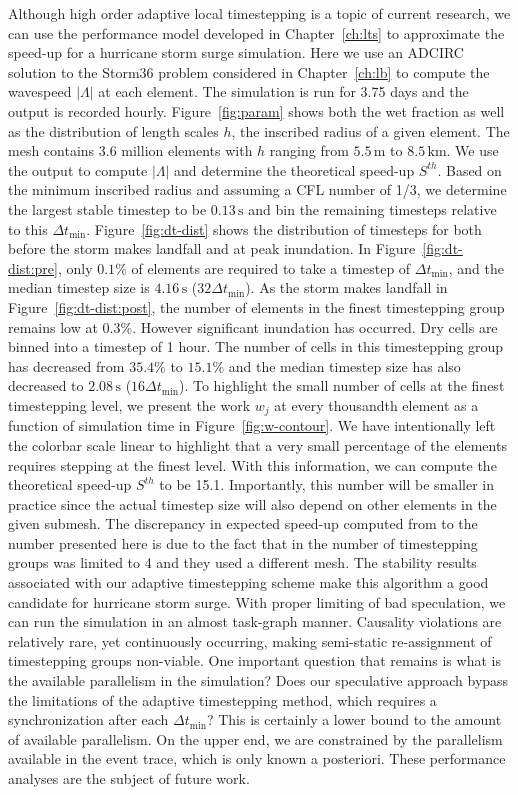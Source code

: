 Although high order adaptive local timestepping is a topic of current research, we can use the performance model developed in Chapter~\ref{ch:lts} to approximate the speed-up for a hurricane storm surge simulation. Here we use an ADCIRC solution to the Storm36 problem considered in Chapter~\ref{ch:lb} to compute the wavespeed $|\Lambda|$ at each element. The simulation is run for 3.75 days and the output is recorded hourly. Figure~\ref{fig:param} shows both the wet fraction as well as the distribution of length scales $h$, the inscribed radius of a given element. The mesh contains 3.6 million elements with $h$ ranging from $5.5\,\mathrm{m}$ to $8.5\,\mathrm{km}$. We use the output to compute $|\Lambda|$ and determine the theoretical speed-up $S^{th}$. Based on the minimum inscribed radius and assuming a CFL number of 1/3, we determine the largest stable timestep to be $0.13 \,\mathrm{s}$ and bin the remaining timesteps relative to this $\Delta t_{\min}$. 
 Figure~\ref{fig:dt-dist} shows the distribution of timesteps for both before the storm makes landfall and at peak inundation. In Figure~\ref{fig:dt-dist:pre}, only $0.1\%$ of elements are required to take a timestep of $\Delta t_{\min}$, and the median timestep size is $4.16\,\mathrm{s}$ ($32 \Delta t_{\min}$). As the storm makes landfall in Figure~\ref{fig:dt-dist:post}, the number of elements in the finest timestepping group remains low at $0.3\%$. However significant inundation has occurred. Dry cells are binned into a timestep of 1 hour. The number of cells in this timestepping group has decreased from $35.4\%$ to $15.1\%$ and the median timestep size has also decreased to $2.08\,\mathrm{s}$ ($16 \Delta t_{\min}$). To highlight the small number of cells at the finest timestepping level, we present the work $w_j$ at every thousandth element as a function of simulation time in Figure~\ref{fig:w-contour}. We have intentionally left the colorbar scale linear to highlight that a very small percentage of the elements requires stepping at the finest level. With this information, we can compute the theoretical speed-up $S^{th}$ to be 15.1. Importantly, this number will be smaller in practice since the actual timestep size will also depend on other elements in the given submesh. The discrepancy in expected speed-up computed from \cite{Dawson2013} to the number presented here is due to the fact that in \cite{Dawson2013} the number of timestepping groups was limited to 4 and they used a different mesh. The stability results associated with our adaptive timestepping scheme make this algorithm a good candidate for hurricane storm surge. With proper limiting of bad speculation, we can run the simulation in an almost task-graph manner. Causality violations are relatively rare, yet continuously occurring, making semi-static re-assignment of timestepping groups non-viable. One important question that remains is what is the available parallelism in the simulation? Does our speculative approach bypass the limitations of the adaptive timestepping method, which requires a synchronization after each $\Delta t_{\min}$? This is certainly a lower bound to the amount of available parallelism. On the upper end, we are constrained by the parallelism available in the event trace, which is only known a posteriori. These performance analyses are the subject of future work.
